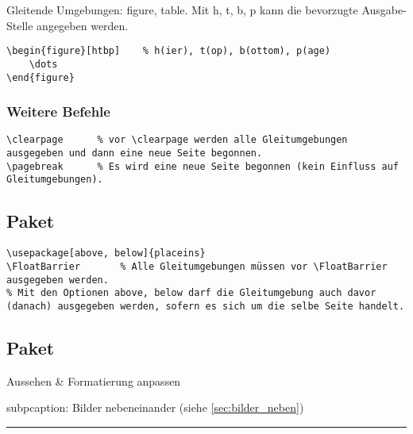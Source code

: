 \mycolumnbreak
{}

	Gleitende Umgebungen: figure, table.
	Mit h, t, b, p kann die bevorzugte Ausgabe-Stelle angegeben werden.
\begin{lstlisting}
\begin{figure}[htbp]	% h(ier), t(op), b(ottom), p(age)
	\dots
\end{figure}
\end{lstlisting}

\subsubsection{Weitere Befehle}
\begin{lstlisting}
\clearpage		% vor \clearpage werden alle Gleitumgebungen ausgegeben und dann eine neue Seite begonnen.
\pagebreak		% Es wird eine neue Seite begonnen (kein Einfluss auf Gleitumgebungen). 
\end{lstlisting}

\subsection{Paket }
\begin{lstlisting}
\usepackage[above, below]{placeins} 
\FloatBarrier		% Alle Gleitumgebungen müssen vor \FloatBarrier ausgegeben werden.
% Mit den Optionen above, below darf die Gleitumgebung auch davor (danach) ausgegeben werden, sofern es sich um die selbe Seite handelt.
\end{lstlisting}

\subsection{Paket }
Aussehen \& Formatierung anpassen

subpcaption: Bilder nebeneinander (siehe \ref{sec:bilder_neben})

\hrule \vspace{0.5\baselineskip}
